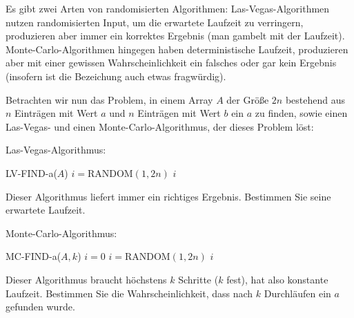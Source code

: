 
\begin{exercise}

Es gibt zwei Arten von randomisierten Algorithmen:
Las-Vegas-Algorithmen nutzen randomisierten Input, um die erwartete Laufzeit zu verringern, produzieren aber immer ein korrektes Ergebnis (man gambelt mit der Laufzeit).
Monte-Carlo-Algorithmen hingegen haben deterministische Laufzeit, produzieren aber mit einer gewissen Wahrscheinlichkeit ein falsches oder gar kein Ergebnis (insofern ist die Bezeichung  auch etwas fragwürdig).

Betrachten wir nun das Problem, in einem Array $A$ der Größe $2 n$ bestehend aus $n$ Einträgen mit Wert $a$ und $n$ Einträgen mit Wert $b$ ein $a$ zu finden, sowie einen Las-Vegas- und einen Monte-Carlo-Algorithmus, der dieses Problem löst:

\phantom{}

Las-Vegas-Algorithmus:

\begin{algorithmic}
    \State LV-FIND-a($A$)
        \State $i = \text{RANDOM}(1, 2 n)$
            \State \Return $i$
        \EndIf
    \EndWhile
\end{algorithmic}

\phantom{}

Dieser Algorithmus liefert immer ein richtiges Ergebnis.
Bestimmen Sie seine erwartete Laufzeit.

\phantom{}

Monte-Carlo-Algorithmus:

\begin{algorithmic}
    \State MC-FIND-a($A, k$)
    \State $i = 0$
        \State $i = \text{RANDOM}(1, 2 n)$
            \State \Return $i$
        \EndIf
    \EndWhile
\end{algorithmic}

\phantom{}

Dieser Algorithmus braucht höchstens $k$ Schritte ($k$ fest), hat also konstante Laufzeit.
Bestimmen Sie die Wahrscheinlichkeit, dass nach $k$ Durchläufen ein $a$ gefunden wurde.

\end{exercise}

